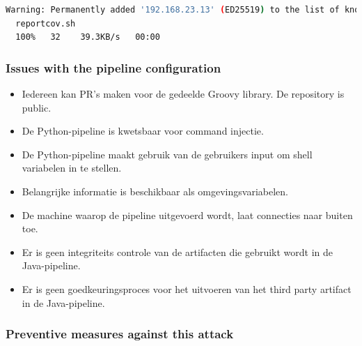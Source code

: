\begin{lstlisting}[language=bash, style=bashstyle]
  Warning: Permanently added '192.168.23.13' (ED25519) to the list of known hosts.
  reportcov.sh
  100%   32    39.3KB/s   00:00   
\end{lstlisting}
\vspace{0.5cm}

\subsubsection{
{Issues with the pipeline configuration}}
\label{sec:Problemen met de pipeline configuratie}

\begin{itemize}
  \item Iedereen kan PR's maken voor de gedeelde Groovy library. De repository is public.
  \item De Python-pipeline is kwetsbaar voor command injectie.
  \item De Python-pipeline maakt gebruik van de gebruikers input om shell variabelen in te stellen.
  \item Belangrijke informatie is beschikbaar als omgevingsvariabelen.
  \item De machine waarop de pipeline uitgevoerd wordt, laat connecties naar buiten toe.
  \item Er is geen integriteits controle van de artifacten die gebruikt wordt in de Java-pipeline.
  \item Er is geen goedkeuringsproces voor het uitvoeren van het third party artifact in de Java-pipeline.
\end{itemize}

\subsubsection{
{Preventive measures against this attack}}
\label{sec:Hoe deze aanval te voorkomen}

